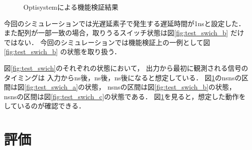 \begin{figure}[t!]
\begin{center}
\caption{Optisystemによる機能検証結果}
\label{fig:test}
\end{center}
\end{figure}
今回のシミュレーションでは光遅延素子で発生する遅延時間が1nsと設定した．
また配列が一部一致の場合，取りうるスイッチ状態は図\ref{fig:test_swich_b}
だけではない．
今回のシミュレーションでは機能検証上の一例として図\ref{fig:test_swich_b}
の状態を取り扱う．

図\ref{fig:test_swich}のそれぞれの状態において，
出力から最初に観測される信号のタイミングは
入力からns後，ns後，ns後になると想定している．
図\ref{fig:test}のnsnsの区間は図\ref{fig:test_swich_a}の状態，
nsnsの区間は図\ref{fig:test_swich_b}の状態，
nsnsの区間は図\ref{fig:test_swich_c}の状態である．
図\ref{fig:test}を見ると，想定した動作をしているのが確認できる．

\section{評価}

